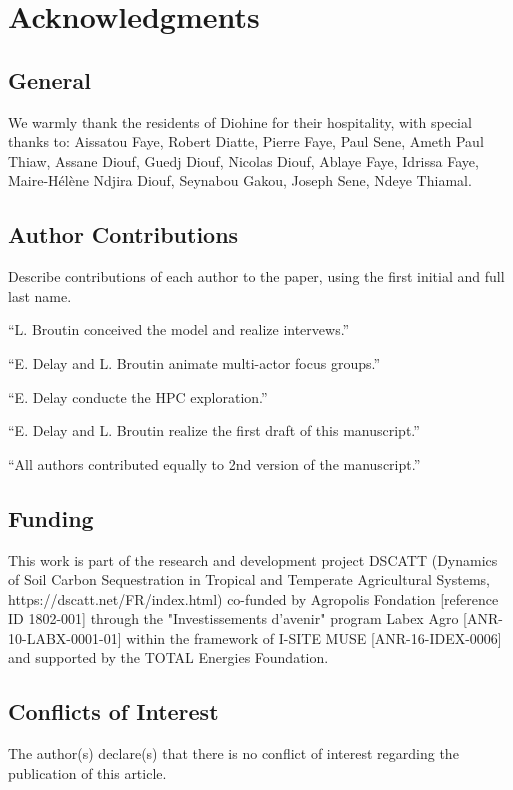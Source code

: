 \documentclass{article}
\begin{document}
\section*{Acknowledgments}

\subsection*{General} 
We warmly thank the residents of Diohine for their hospitality, with special thanks to: Aissatou Faye, Robert Diatte, Pierre Faye, Paul Sene, Ameth Paul Thiaw, Assane Diouf, Guedj Diouf, Nicolas Diouf, Ablaye Faye, Idrissa Faye, Maire-Hélène Ndjira Diouf, Seynabou Gakou, Joseph Sene, Ndeye Thiamal.

\subsection*{Author Contributions} 
Describe contributions of each author to the paper, using the first initial and full last name. 

``L. Broutin conceived the model and realize intervews.''

``E. Delay and L. Broutin animate multi-actor focus groups.''

``E. Delay conducte the HPC exploration.''

``E. Delay and L. Broutin realize the first draft of this manuscript.''

``All authors contributed equally to 2nd version of the manuscript.''

\subsection*{Funding}

This work is part of the research and development project DSCATT (Dynamics of Soil Carbon Sequestration in Tropical and Temperate Agricultural Systems, https://dscatt.net/FR/index.html) co-funded by Agropolis Fondation [reference ID 1802-001] through the "Investissements d'avenir" program Labex Agro [ANR-10-LABX-0001-01] within the framework of I-SITE MUSE [ANR-16-IDEX-0006] and supported by the TOTAL Energies Foundation.

\subsection*{Conflicts of Interest}
The author(s) declare(s) that there is no conflict of interest regarding the publication of this article.
\end{document}
